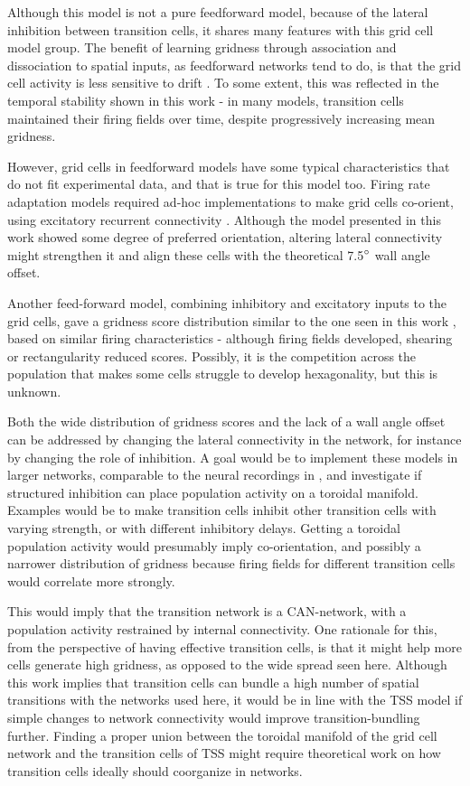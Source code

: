 \documentclass{article}
\begin{document}
    Although this model is not a pure feedforward model, because of the lateral inhibition between transition cells, it shares many features with this grid cell model group. The benefit of learning gridness through association and dissociation to spatial inputs, as feedforward networks tend to do, is that the grid cell activity is less sensitive to drift \parencite{Mulas2016}. To some extent, this was reflected in the temporal stability shown in this work - in many models, transition cells maintained their firing fields over time, despite progressively increasing mean gridness.

    However, grid cells in feedforward models have some typical characteristics that do not fit experimental data, and that is true for this model too. Firing rate adaptation models required ad-hoc implementations to make grid cells co-orient, using excitatory recurrent connectivity \parencite{Barry2006,Si2013}. Although the model presented in this work showed some degree of preferred orientation, altering lateral connectivity might strengthen it and align these cells with the theoretical 7.5\(\degree\) wall angle offset. 

    Another feed-forward model, combining inhibitory and excitatory inputs to the grid cells, gave a gridness score distribution similar to the one seen in this work \parencite{Weber2018}, based on similar firing characteristics - although firing fields developed, shearing or rectangularity reduced scores. Possibly, it is the competition across the population that makes some cells struggle to develop hexagonality, but this is unknown.

    Both the wide distribution of gridness scores and the lack of a wall angle offset can be addressed by changing the lateral connectivity in the network, for instance by changing the role of inhibition. A goal would be to implement these models in larger networks, comparable to the neural recordings in \parencite{Gardner2022}, and investigate if structured inhibition can place population activity on a toroidal manifold. Examples would be to make transition cells inhibit other transition cells with varying strength, or with different inhibitory delays. Getting a toroidal population activity would presumably imply co-orientation, and possibly a narrower distribution of gridness because firing fields for different transition cells would correlate more strongly.
    
    This would imply that the transition network is a CAN-network, with a population activity restrained by internal connectivity. One rationale for this, from the perspective of having effective transition cells, is that it might help more cells generate high gridness, as opposed to the wide spread seen here. Although this work implies that transition cells can bundle a high number of spatial transitions with the networks used here, it would be in line with the TSS model if simple changes to network connectivity would improve transition-bundling further. Finding a proper union between the toroidal manifold of the grid cell network and the transition cells of TSS might require theoretical work on how transition cells ideally should coorganize in networks.
    
\end{document}
